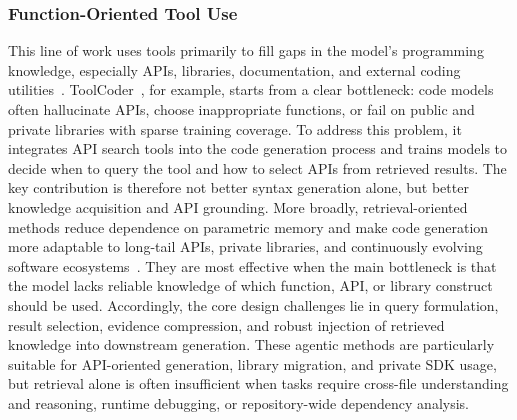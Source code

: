 \subsubsection{Function-Oriented Tool Use}
This line of work uses tools primarily to fill gaps in the model's programming knowledge, especially APIs, libraries, documentation, and external coding utilities~\cite{zhang2023toolcoder,ahmed2024codeqa,zhao2025rag,li2025survey,yuan2025easytool, zou2025autotool}. ToolCoder~\cite{zhang2023toolcoder}, for example, starts from a clear bottleneck: code models often hallucinate APIs, choose inappropriate functions, or fail on public and private libraries with sparse training coverage. To address this problem, it integrates API search tools into the code generation process and trains models to decide when to query the tool and how to select APIs from retrieved results. The key contribution is therefore not better syntax generation alone, but better knowledge acquisition and API grounding. More broadly, retrieval-oriented methods reduce dependence on parametric memory and make code generation more adaptable to long-tail APIs, private libraries, and continuously evolving software ecosystems~\cite{zhao2025rag,zhou2023devil}. They are most effective when the main bottleneck is that the model lacks reliable knowledge of which function, API, or library construct should be used. Accordingly, the core design challenges lie in query formulation, result selection, evidence compression, and robust injection of retrieved knowledge into downstream generation. These agentic methods are particularly suitable for API-oriented generation, library migration, and private SDK usage, but retrieval alone is often insufficient when tasks require cross-file understanding and reasoning, runtime debugging, or repository-wide dependency analysis.





